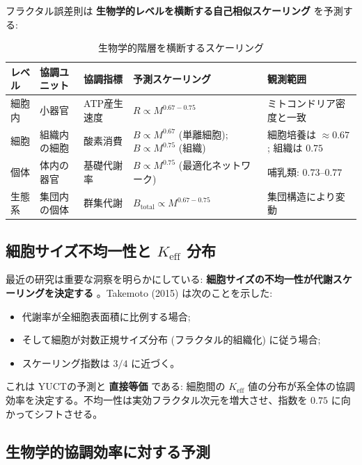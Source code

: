 \documentclass[12pt]{article}
\newcommand{\Keff}{K_{\mathrm{eff}}}
\begin{document}
	フラクタル誤差則は \textbf{生物学的レベルを横断する自己相似スケーリング} を予測する:
	
	\begin{table}[htbp]
		\centering
		\caption{生物学的階層を横断するスケーリング}
		\label{tab:hierarchical-scaling}
		\footnotesize
		\begin{tabular}{p{2.5cm} p{3cm} p{3cm} p{2.5cm} p{3cm}}
			\toprule
			\textbf{レベル} & \textbf{協調ユニット} & \textbf{協調指標} & \textbf{予測スケーリング} & \textbf{観測範囲} \\
			\midrule
			細胞内 & 小器官 & ATP産生速度 & \(R \propto M^{0.67-0.75}\) & ミトコンドリア密度と一致 \cite{West2002} \\
			細胞 & 組織内の細胞 & 酸素消費 & \(B \propto M^{0.67}\) (単離細胞); \(B \propto M^{0.75}\) (組織) & 細胞培養は \(\approx 0.67\); 組織は \(0.75\) \cite{West2002} \\
			個体 & 体内の器官 & 基礎代謝率 & \(B \propto M^{0.75}\) (最適化ネットワーク) & 哺乳類: \(0.73\)–\(0.77\) \cite{Kleiber1932} \\
			生態系 & 集団内の個体 & 群集代謝 & \(B_{\text{total}} \propto M^{0.67-0.75}\) & 集団構造により変動 \cite{Glazier2005} \\
			\bottomrule
		\end{tabular}
	\end{table}
	
	\subsection{細胞サイズ不均一性と \(\Keff\) 分布}
	
	最近の研究は重要な洞察を明らかにしている: \textbf{細胞サイズの不均一性が代謝スケーリングを決定する} \cite{Takemoto2015}。Takemoto (2015) は次のことを示した:
	\begin{itemize}
		\item 代謝率が全細胞表面積に比例する場合;
		\item そして細胞が対数正規サイズ分布 (フラクタル的組織化) に従う場合;
		\item スケーリング指数は \(3/4\) に近づく。
	\end{itemize}
	これは YUCTの予測と \textbf{直接等価} である: 細胞間の \(\Keff\) 値の分布が系全体の協調効率を決定する。不均一性は実効フラクタル次元を増大させ、指数を \(0.75\) に向かってシフトさせる。
	
	\subsection{生物学的協調効率に対する予測}
	
\end{document}
